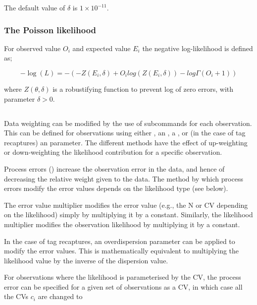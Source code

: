 The default value of $\delta$ is $1 \times 10^{-11}$.


\subsubsection*{The Poisson likelihood}

For observed value $O_i$ and expected value $E_i$ the negative log-likelihood is defined as;

\begin{equation}
	-\log \left(L \right) = -\left(-Z\left(E_i,\delta \right) + O_i log\left(Z\left(E_i,\delta \right)\right) - log \Gamma \left(O_i+1\right) \right)
\end{equation}

where $Z \left(\theta,\delta \right)$ is a robustifying function to prevent log of zero errors, with parameter $\delta>0$.

\subsection{}

Data weighting can be modified by the use of subcommands for each observation. This can be defined for observations using either , an , a , or (in the case of tag recaptures) an  parameter.  The different methods have the effect of up-weighting or down-weighting the likelihood contribution for a specific observation. 

 Process errors () increase the observation error in the data, and hence of decreasing the relative weight given to the data. The method by which process errors modify the error values depends on the likelihood type (see below).
 
 The error value multiplier modifies the error value (e.g., the N or CV depending on the likelihood) simply by multiplying it by a constant. Similarly, the likelihood multiplier modifies the observation likelihood by multiplying it by a constant.
 
 In the case of tag recaptures, an overdispersion parameter can be applied to modify the error values. This is mathematically equivalent to multiplying the likelihood value by the inverse of the dispersion value.

For observations where the likelihood is parameterised by the CV, the process error can be specified for a given set of observations as a CV, in which case all the CVs $c_i$ are changed to

